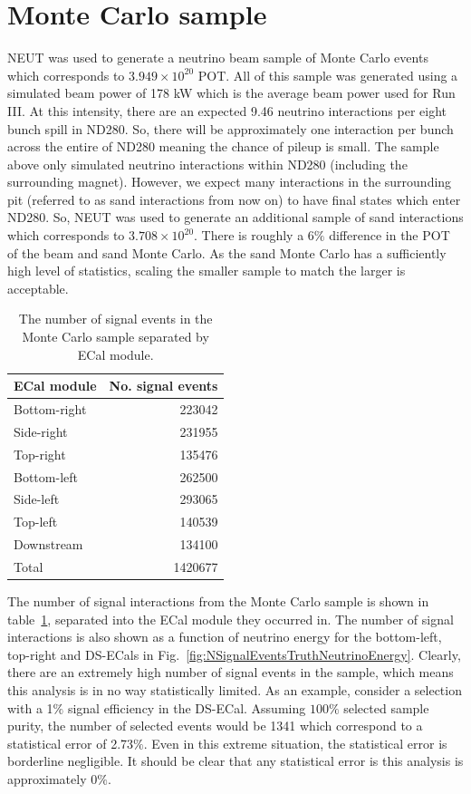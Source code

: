 \section{Monte Carlo sample}
\label{sec:MonteCarloSample}
NEUT was used to generate a neutrino beam sample of Monte Carlo events which corresponds to $3.949\times10^{20}$ POT.  All of this sample was generated using a simulated beam power of 178 kW which is the average beam power used for Run III.  At this intensity, there are an expected 9.46 neutrino interactions per eight bunch spill in ND280.  So, there will be approximately one interaction per bunch across the entire of ND280 meaning the chance of pileup is small. 
\newline
\newline
The sample above only simulated neutrino interactions within ND280 (including the surrounding magnet).  However, we expect many interactions in the surrounding pit (referred to as sand interactions from now on) to have final states which enter ND280.  So, NEUT was used to generate an additional sample of sand interactions which corresponds to $3.708\times10^{20}$.  There is roughly a 6$\%$ difference in the POT of the beam and sand Monte Carlo.  As the sand Monte Carlo has a sufficiently high level of statistics, scaling the smaller sample to match the larger is acceptable.
\newline
\newline
\begin{table}
  \begin{tabular}{ l r }
    ECal module & No. signal events \\ \hline \hline
    Bottom-right & 223042 \\
    Side-right & 231955 \\
    Top-right & 135476 \\
    Bottom-left & 262500 \\
    Side-left & 293065 \\
    Top-left & 140539 \\
    Downstream & 134100 \\
    \hline
    Total & 1420677 \\
  \end{tabular}
  \caption{The number of signal events in the Monte Carlo sample separated by ECal module.}
  \label{table:NSignalEventsTruth}
\end{table}
The number of signal interactions from the Monte Carlo sample is shown in table~\ref{table:NSignalEventsTruth}, separated into the ECal module they occurred in.  The number of signal interactions is also shown as a function of neutrino energy for the bottom-left, top-right and DS-ECals in Fig.~\ref{fig:NSignalEventsTruthNeutrinoEnergy}.  Clearly, there are an extremely high number of signal events in the sample, which means this analysis is in no way statistically limited.  As an example, consider a selection with a 1$\%$ signal efficiency in the DS-ECal.  Assuming $100\%$ selected sample purity, the number of selected events would be 1341 which correspond to a statistical error of 2.73$\%$.  Even in this extreme situation, the statistical error is borderline negligible.  It should be clear that any statistical error is this analysis is approximately $0\%$.
